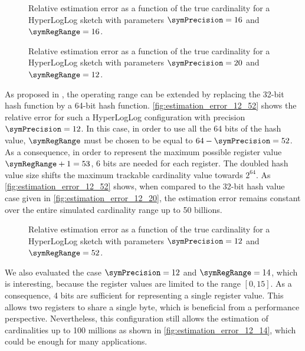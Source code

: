 \documentclass[11pt]{article} %
\begin{document}
\begin{figure}
\centering

\caption{Relative estimation error as a function of the true cardinality for a HyperLogLog sketch with parameters $\symPrecision = 16$ and $\symRegRange=16$.}
\label{fig:estimation_error_16_16}
\end{figure}

\begin{figure}
\centering

\caption{Relative estimation error as a function of the true cardinality for a HyperLogLog sketch with parameters $\symPrecision = 20$ and $\symRegRange=12$.}
\label{fig:estimation_error_20_12}
\end{figure}

As proposed in \cite{Heule2013}, the operating range can be extended by
replacing the 32-bit hash function by a 64-bit hash function. \autoref{fig:estimation_error_12_52} shows the relative error for such a HyperLogLog configuration with precision  $\symPrecision=12$. In this case, in order to use all the 64 bits of the hash value, $\symRegRange$ must be chosen to be equal to $64 - \symPrecision = 52$. As a consequence, in order to represent the maximum possible register value $\symRegRange+1 = 53$, 6 bits are needed for each register. The doubled hash value size shifts the maximum trackable cardinality value towards $2^{64}$. As \autoref{fig:estimation_error_12_52} shows, when compared to the 32-bit hash value case given in \autoref{fig:estimation_error_12_20}, the estimation error remains constant over the entire simulated cardinality range up to 50 billions.

\begin{figure}
\centering

\caption{Relative estimation error as a function of the true cardinality for a HyperLogLog sketch with parameters $\symPrecision = 12$ and $\symRegRange=52$.}
\label{fig:estimation_error_12_52}
\end{figure}

We also evaluated the case $\symPrecision = 12$ and $\symRegRange=14$, which is interesting, because the register values are limited to the range $[0, 15]$. As a consequence, 4 bits are sufficient for representing a single register value. This allows two registers to share a single byte, which is beneficial from a performance perspective. Nevertheless, this configuration still allows the estimation of cardinalities up to 100 millions as shown in \autoref{fig:estimation_error_12_14}, which could be enough for many applications.
\end{document}
